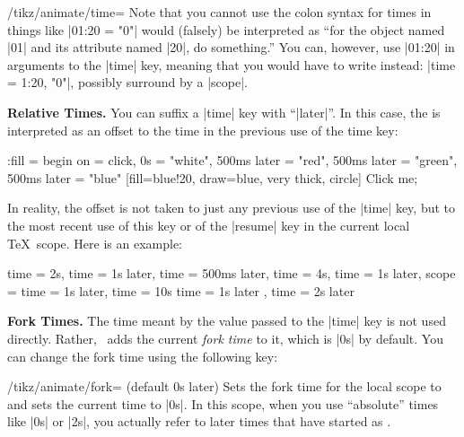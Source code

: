 \begin{key}{/tikz/animate/time=}
  Note that you cannot use the colon syntax for times in things like
  |01:20 = "0"| would (falsely) be interpreted as ``for the object named
  |01| and its attribute named |20|, do something.'' You can, however,
  use |01:20| in arguments to the |time| key, meaning that you would
  have to write instead: |time = 1:20, "0"|, possibly surround by a
  |scope|. 

  \medskip\textbf{Relative Times.}
  You can suffix a |time| key with ``|later|''. In this case, the
   is interpreted as an offset to the time in the previous
  use of the time key:

\begin{codeexample}[animation list={0.5,1,1.5,2}]
\tikz \node :fill = { begin on = click,
    0s = "white",
    500ms later = "red",
    500ms later = "green",  %
    500ms later = "blue"} %
  [fill=blue!20, draw=blue, very thick, circle] {Click me};
\end{codeexample}

  In reality, the offset is not taken to just any previous use of the
  |time| key, but to the most recent use of this key or of the
  |resume| key in the current local \TeX\ scope. Here is an example:
\begin{codeexample}
time = 2s,
time = 1s later,    %
time = 500ms later, %
time = 4s,
time = 1s later,    %
scope = {           %
  time = 1s later,  %
  time = 10s
  time = 1s later   %
},                  %
time = 2s later     %
\end{codeexample}

  \medskip\textbf{Fork Times.}
  The time meant by the value  passed to the |time| key is
  not used directly. Rather, \tikzname\ adds the current \emph{fork
    time} to it, which is |0s| by default. You can change the fork
  time using the following key:
  \begin{key}{/tikz/animate/fork= (default 0s later)}
    Sets the fork time for the local scope to  and sets the
    current time to |0s|. In this scope, when you use ``absolute''
    times like |0s| or |2s|, you actually refer to later times that
    have started as . 


\end{key}
\end{key}
